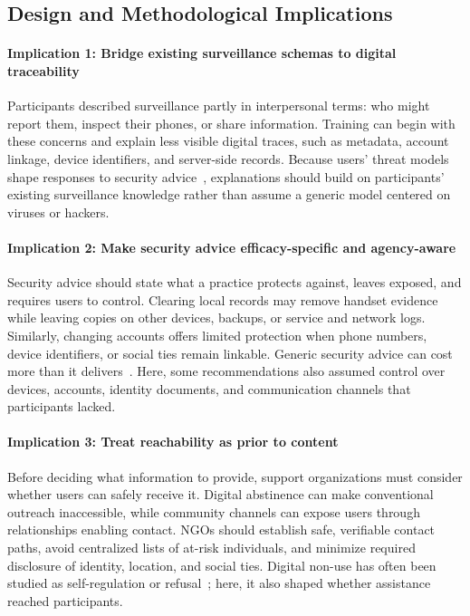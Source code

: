\documentclass[conference,compsoc]{IEEEtran}
\begin{document}
\subsection{Design and Methodological Implications}

\paragraph{\textbf{Implication 1: Bridge existing surveillance schemas to digital traceability}}

Participants described surveillance partly in interpersonal terms: who might report them, inspect their phones, or share information. Training can begin with these concerns and explain less visible digital traces, such as metadata, account linkage, device identifiers, and server-side records. Because users' threat models shape responses to security advice~\cite{wash2010folk}, explanations should build on participants' existing surveillance knowledge rather than assume a generic model centered on viruses or hackers.

\paragraph{\textbf{Implication 2: Make security advice efficacy-specific and agency-aware}}

Security advice should state what a practice protects against, leaves exposed, and requires users to control. Clearing local records may remove handset evidence while leaving copies on other devices, backups, or service and network logs. Similarly, changing accounts offers limited protection when phone numbers, device identifiers, or social ties remain linkable. Generic security advice can cost more than it delivers~\cite{herley2009so,ion2015no}. Here, some recommendations also assumed control over devices, accounts, identity documents, and communication channels that participants lacked.

\paragraph{\textbf{Implication 3: Treat reachability as prior to content}}

Before deciding what information to provide, support organizations must consider whether users can safely receive it. Digital abstinence can make conventional outreach inaccessible, while community channels can expose users through relationships enabling contact. NGOs should establish safe, verifiable contact paths, avoid centralized lists of at-risk individuals, and minimize required disclosure of identity, location, and social ties. Digital non-use has often been studied as self-regulation or refusal~\cite{baumer2013limiting,schoenebeck2014giving,satchell2009beyond}; here, it also shaped whether assistance reached participants.
\end{document}
